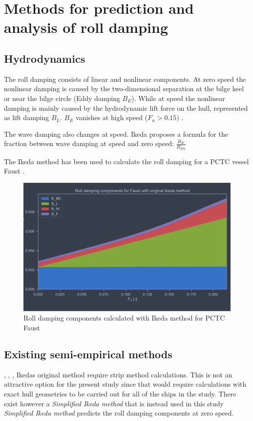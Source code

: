 \section{Methods for prediction and analysis of roll damping}
\label{se:methods_for_prediction_and_analysis}

\subsection{Hydrodynamics}
\label{se:hydrodynamics}
The roll damping consists of linear and nonlinear components. At zero speed the nonlinear damping is caused by the two-dimensional separation at the bilge keel or near the bilge circle (Eddy damping $B_E$). While at speed the nonlinear damping is mainly caused by the hydrodynamic lift force on the hull, represented as lift damping $B_L$. $B_E$ vanishes at high speed ($F_n>0.15)$ \cite{ikeda_components_1978}.

The wave damping also changes at speed. Ikeda \cite{ikeda_components_1978} proposes a formula for the fraction between wave damping at speed and zero speed: $\frac{B_W}{B_{W0}}$

The Ikeda method has been used to calculate the roll damping for a PCTC vessel Faust \cite{soder_assessment_2019}.
\begin{figure}[h]
    \centering
    \includegraphics[width=\columnwidth]{figures/ikeda_faust.pdf}
    \caption{Roll damping components calculated with Ikeda method for PCTC Faust}
    \label{fig:ikeda_faust}
\end{figure}

\subsection{Existing semi-empirical methods}
\cite{ikeda_roll_1978}, \cite{ikeda_eddy_1978}, \cite{ikeda_roll_1979}, \cite{ikeda_components_1978}
Ikedas original method require strip method calculations. This is not an attractive option for the present study since that would require calculations with exact hull geometries to be carried out for all of the ships in the study. There exist however a \emph{Simplified Ikeda method} \cite{kawahara_simple_2011} that is instead used in this study \emph{Simplified Ikeda method} predicts the roll damping components at zero speed.

